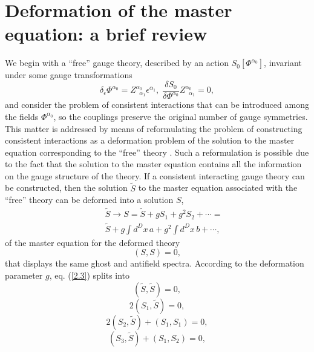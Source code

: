 \documentclass[a4paper,12pt]{article}
\begin{document}
\section{Deformation of the master
equation: a brief review}

We begin with a ``free'' gauge theory,
described by an action $S_{0}\left[
\Phi ^{\alpha _{0}}\right] $, invariant
under some gauge transformations 
\begin{equation}
\delta _{\epsilon }\Phi ^{\alpha _{0}}=
Z_{\;\;\alpha _{1}}^{\alpha
_{0}}\epsilon ^{\alpha _{1}},\;
\frac{\delta S_{0}}{\delta \Phi ^{\alpha _{0}}%
}Z_{\;\;\alpha _{1}}^{\alpha _{0}}=0,
\label{2.1}
\end{equation}
and consider the problem of consistent
interactions that can be introduced
among the fields $\Phi ^{\alpha _{0}}$,
so the couplings preserve the
original number of gauge symmetries.
This matter is addressed by means of
reformulating the problem of constructing
consistent interactions as a
deformation problem of the solution to the
master equation corresponding to
the ``free'' theory \cite{3}. Such a
reformulation is possible due to the
fact that the solution to the master
equation contains all the information
on the gauge structure of the theory.
If a consistent interacting gauge
theory can be constructed, then the
solution $\tilde{S}$ to the master
equation associated with the ``free''
theory can be deformed into a solution
$S$,
\begin{eqnarray}
&&\tilde{S}\rightarrow S=\tilde{S}+gS_{1}+
g^{2}S_{2}+\cdots =  \nonumber \\
&&\tilde{S}+g\int d^{D}x\,a+g^{2}\int d^{D}x\,b+
\cdots ,  \label{2.2}
\end{eqnarray}
of the master equation for the deformed theory
\begin{equation}
\left( S,S\right) =0,  \label{2.3}
\end{equation}
that displays the same ghost and antifield
spectra. According to the
deformation parameter $g$, eq. (\ref{2.3}) splits into
\begin{equation}
\left( \tilde{S},\tilde{S}\right) =0,  \label{2.4}
\end{equation}
\begin{equation}
2\left( S_{1},\tilde{S}\right) =0,  \label{2.5}
\end{equation}
\begin{equation}
2\left( S_{2},\tilde{S}\right) +
\left( S_{1},S_{1}\right) =0,  \label{2.6}
\end{equation}
\begin{equation}
\left( S_{3},\tilde{S}\right) +
\left( S_{1},S_{2}\right) =0,  \label{2.7}
\end{equation}
\end{document}
